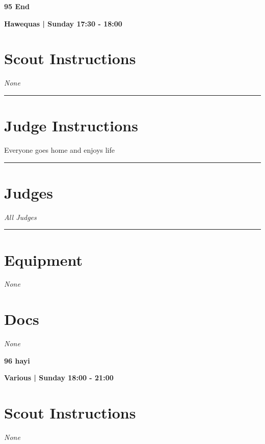 \documentclass[10pt]{article}
\newcommand{\newtitle}[1]{\begin{center}{\Huge\bfseries #1 }\\ \vspace{5mm}\end{center}}
\newcommand{\newsubtitle}[1]{\begin{center}{\color{grey}\Large\bfseries #1 }\\ \vspace{5mm}\end{center}}
\begin{document}
	\clearpage
		\newtitle{95 End }
	\newsubtitle{Hawequas | Sunday 17:30 - 18:00}
		\setcounter{section}{94}
	\section*{Scout Instructions}
		\textit{None}
	
	\vspace{0.5cm}
	\hrule
	\vspace{0.5cm}

		\section*{Judge Instructions}
		Everyone goes home and enjoys life
\vspace{0.5cm}
	\hrule
	\vspace{0.5cm}
		\section*{\faUsers \: Judges}

					\textit{All Judges}
			\vspace{0.5cm}
	\hrule
	\vspace{0.5cm}

	\begin{multicols}{2}

		\section*{\faWrench \: Equipment}

				\textit{None}
		
		\vfill\null
		\columnbreak

			\section*{\faFile \: Docs}
		 	\textit{None}
	

		\vfill\null

		\end{multicols}



	\vspace{1cm}


	\clearpage
		\newtitle{96 hayi }
	\newsubtitle{Various | Sunday 18:00 - 21:00}
		\setcounter{section}{95}
	\section*{Scout Instructions}
		\textit{None}
	
\end{document}
